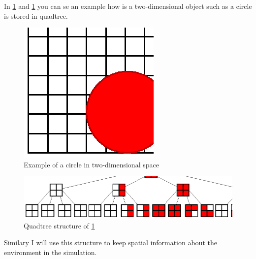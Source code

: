 In \ref{usedalgorithms:qtc} and \ref{usedalgorithms:qtc} you can se an example how is a two-dimensional object such as a circle is stored in quadtree.               
                  
\begin{figure}
  \centering                                      
  \includegraphics[scale=1]{diagrams/usedalgorithms/quadtree-circle.eps} 
  \caption{Example of a circle in two-dimensional space}      
  \label{usedalgorithms:qtc}
\end{figure}

\begin{figure}
  \centering                                
  \includegraphics[scale=.8]{diagrams/usedalgorithms/quadtree-treeview.eps} 
  \caption{Quadtree structure of \ref{usedalgorithms:qtc}}
  \label{usedalgorithms:qttv}
\end{figure}
 
Similary I will use this structure to keep spatial information about the environment in the simulation.
